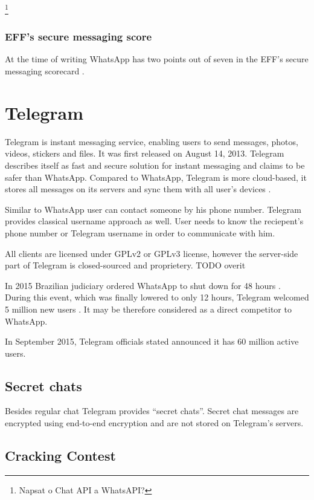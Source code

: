\documentclass[thesis=M,english]{FITthesis}[2012/10/20]
\begin{document}
\footnote{Napsat o Chat API a WhatsAPI?}

\subsubsection{EFF's secure messaging score}

At the time of writing WhatsApp has two points out of seven in the EFF's secure messaging scorecard \cite{eff-score}.


\section{Telegram}

Telegram is instant messaging service, enabling users to send messages, photos, videos, stickers and files. It was first released on August 14, 2013\cite{telegramfaq}. Telegram describes itself as fast and secure solution for instant messaging \cite{telegramfaq} and claims to be safer than WhatsApp\cite{telegramfaq}. Compared to WhatsApp, Telegram is more cloud-based, it stores all messages on its servers and sync them with all user's devices \cite{telegramfaq}. 

Similar to WhatsApp user can contact someone by his phone number. Telegram provides classical username approach as well. User needs to know the reciepent's phone number or Telegram username in order to communicate with him.

All clients are licensed under GPLv2 or GPLv3 license, however the server-side part of Telegram is closed-sourced and proprietery. TODO overit

In 2015 Brazilian judiciary ordered WhatsApp to shut down for 48 hours \cite{whatsappbrazil}. During this event, which was finally lowered to only 12 hours, Telegram welcomed 5 million new users \cite{whatsappbrazil}. It may be therefore considered as a direct competitor to WhatsApp.

In September 2015, Telegram officials stated announced it has 60 million active users.\cite{x}


\subsection{Secret chats}

Besides regular chat Telegram provides ``secret chats''. Secret chat messages are encrypted using end-to-end encryption and are not stored on Telegram's servers\cite{telegramfaq}.

\subsection{Cracking Contest}
\end{document}
